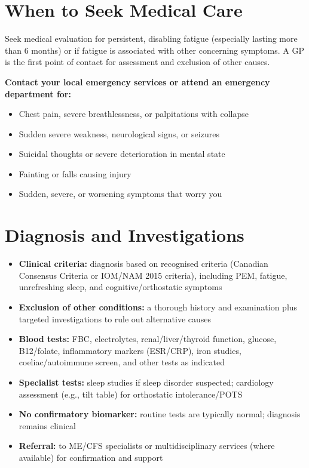 \section*{When to Seek Medical Care}
Seek medical evaluation for persistent, disabling fatigue (especially lasting more than 6 months) or if fatigue is associated with other concerning symptoms. A GP is the first point of contact for assessment and exclusion of other causes.

\textbf{Contact your local emergency services or attend an emergency department for:}
\begin{itemize}
    \item Chest pain, severe breathlessness, or palpitations with collapse
    \item Sudden severe weakness, neurological signs, or seizures
    \item Suicidal thoughts or severe deterioration in mental state
    \item Fainting or falls causing injury
    \item Sudden, severe, or worsening symptoms that worry you
\end{itemize}

\section*{Diagnosis and Investigations}
\begin{itemize}
    \item \textbf{Clinical criteria:} diagnosis based on recognised criteria (Canadian Consensus Criteria or IOM/NAM 2015 criteria), including PEM, fatigue, unrefreshing sleep, and cognitive/orthostatic symptoms
    \item \textbf{Exclusion of other conditions:} a thorough history and examination plus targeted investigations to rule out alternative causes
    \item \textbf{Blood tests:} FBC, electrolytes, renal/liver/thyroid function, glucose, B12/folate, inflammatory markers (ESR/CRP), iron studies, coeliac/autoimmune screen, and other tests as indicated
    \item \textbf{Specialist tests:} sleep studies if sleep disorder suspected; cardiology assessment (e.g., tilt table) for orthostatic intolerance/POTS
    \item \textbf{No confirmatory biomarker:} routine tests are typically normal; diagnosis remains clinical
    \item \textbf{Referral:} to ME/CFS specialists or multidisciplinary services (where available) for confirmation and support
\end{itemize}

